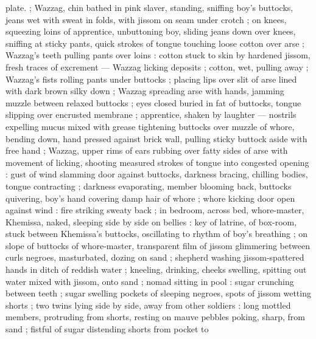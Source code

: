 {plate.} ; Wazzag, chin bathed in pink slaver, standing, sniffing boy's buttocks, jeans wet with sweat in folds, with jissom on seam under crotch ; on knees, squeezing loins of apprentice, unbuttoning boy, sliding jeans down over knees, sniffing at sticky pants, quick strokes of tongue touching loose cotton over arse{\td}  ; Wazzag's teeth pulling pants over loins : cotton stuck to skin by hardened jissom, fresh traces of excrement --- Wazzag licking deposits ; cotton, wet, pulling away ; Wazzag's fists rolling pants under buttocks ; placing lips over slit of arse lined with dark brown silky down ; Wazzag spreading arse with hands, jamming muzzle between relaxed buttocks ; eyes closed buried in fat of buttocks, tongue slipping over encrusted membrane ; apprentice, shaken by laughter --- nostrils expelling mucus mixed with grease {\dashcom} tightening buttocks over muzzle of whore, bending down, hand pressed against brick wall, pulling sticky buttock aside with free hand ; Wazzag, upper rims of ears rubbing over fatty sides of arse with movement of licking, shooting measured strokes of tongue into congested opening : gust of wind slamming door against buttocks, darkness bracing, chilling bodies, tongue contracting ; darkness evaporating, member blooming back, buttocks quivering, boy's hand covering damp hair of whore ; whore kicking door open against wind : fire striking sweaty back ; in bedroom, across bed, whore-master, Khemissa, naked, sleeping side by side on bellies : key of latrine, of box-room, stuck between Khemissa's buttocks, oscillating to rhythm of boy's breathing ; on slope of buttocks of whore-master, transparent film of jissom glimmering between curls {\slashsemislash} negroes, masturbated, dozing on sand ; shepherd washing jissom-spattered hands in ditch of reddish water ; kneeling, drinking, cheeks swelling, spitting out water mixed with jissom, onto sand ; nomad sitting in pool : sugar crunching between teeth ; sugar swelling pockets of sleeping negroes, spots of jissom wetting shorts ; two twins lying side by side, away from other soldiers : long mottled members, protruding from shorts, resting on mauve pebbles poking, sharp, from sand ; fistful of sugar distending shorts from pocket to 
